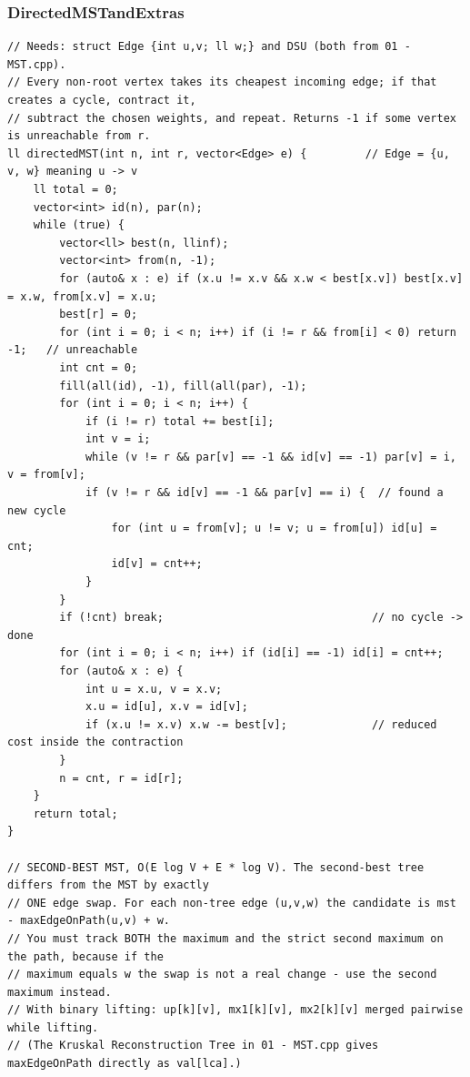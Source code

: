 \documentclass[9pt,a4paper,twocolumn]{extarticle}
\begin{document}
\filbreak
\subsubsection{DirectedMSTandExtras}
\nopagebreak
\begin{lstlisting}
// Needs: struct Edge {int u,v; ll w;} and DSU (both from 01 - MST.cpp).
// Every non-root vertex takes its cheapest incoming edge; if that creates a cycle, contract it,
// subtract the chosen weights, and repeat. Returns -1 if some vertex is unreachable from r.
ll directedMST(int n, int r, vector<Edge> e) {         // Edge = {u, v, w} meaning u -> v
    ll total = 0;
    vector<int> id(n), par(n);
    while (true) {
        vector<ll> best(n, llinf);
        vector<int> from(n, -1);
        for (auto& x : e) if (x.u != x.v && x.w < best[x.v]) best[x.v] = x.w, from[x.v] = x.u;
        best[r] = 0;
        for (int i = 0; i < n; i++) if (i != r && from[i] < 0) return -1;   // unreachable
        int cnt = 0;
        fill(all(id), -1), fill(all(par), -1);
        for (int i = 0; i < n; i++) {
            if (i != r) total += best[i];
            int v = i;
            while (v != r && par[v] == -1 && id[v] == -1) par[v] = i, v = from[v];
            if (v != r && id[v] == -1 && par[v] == i) {  // found a new cycle
                for (int u = from[v]; u != v; u = from[u]) id[u] = cnt;
                id[v] = cnt++;
            }
        }
        if (!cnt) break;                                // no cycle -> done
        for (int i = 0; i < n; i++) if (id[i] == -1) id[i] = cnt++;
        for (auto& x : e) {
            int u = x.u, v = x.v;
            x.u = id[u], x.v = id[v];
            if (x.u != x.v) x.w -= best[v];             // reduced cost inside the contraction
        }
        n = cnt, r = id[r];
    }
    return total;
}

// SECOND-BEST MST, O(E log V + E * log V). The second-best tree differs from the MST by exactly
// ONE edge swap. For each non-tree edge (u,v,w) the candidate is mst - maxEdgeOnPath(u,v) + w.
// You must track BOTH the maximum and the strict second maximum on the path, because if the
// maximum equals w the swap is not a real change - use the second maximum instead.
// With binary lifting: up[k][v], mx1[k][v], mx2[k][v] merged pairwise while lifting.
// (The Kruskal Reconstruction Tree in 01 - MST.cpp gives maxEdgeOnPath directly as val[lca].)


\end{lstlisting}
\end{document}
